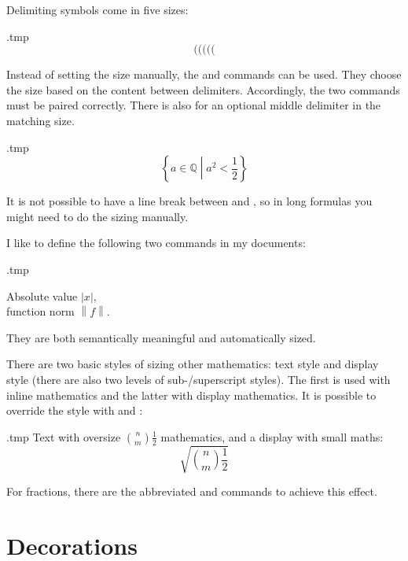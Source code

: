 Delimiting symbols come in five sizes:
\begin{VerbatimOut}{\jobname.tmp}
\[
( \big( \Big( \bigg( \Bigg(
\]
\end{VerbatimOut}
\ShowExample
%
Instead of setting the size manually,
the  and  commands can be used.
They choose the size based on the content between delimiters.
Accordingly, the two commands must be paired correctly.
There is also  for an optional middle delimiter in the matching size.
%
\begin{VerbatimOut}{\jobname.tmp}
\[
\left\{ a \in \mathbb Q
  \middle| a^2 < \frac 1 2 \right\}
\]
\end{VerbatimOut}
\ShowExample

\begin{gotcha}
It is not possible to have a line break between  and ,
so in long formulas you might need to do the sizing manually.
\end{gotcha}

\begin{practices}
I like to define the following two commands in my documents:
%
\begin{VerbatimOut}{\jobname.tmp}
\newcommand{\abs}[1]{\left|#1\right|}
\newcommand{\norm}[1]{\left\|#1\right\|}

Absolute value $\abs x$,\\
function norm $\norm f$.
\end{VerbatimOut}
\ShowExample
%
They are both semantically meaningful and automatically sized.
\end{practices}

There are two basic styles of sizing other mathematics: text style and display style
(there are also two levels of sub-/superscript styles).
The first is used with inline mathematics and the latter with display mathematics.
It is possible to override the style with  and :
%
\begin{VerbatimOut}{\jobname.tmp}
Text with oversize
$\displaystyle \binom n m \frac 1 2$
mathematics, and a display with small maths:
\[
\sqrt{\textstyle \binom n m \frac 1 2}
\]
\end{VerbatimOut}
\ShowExample
%
For fractions, there are the abbreviated  and  commands
to achieve this effect.


%
%
%
\section{Decorations}

